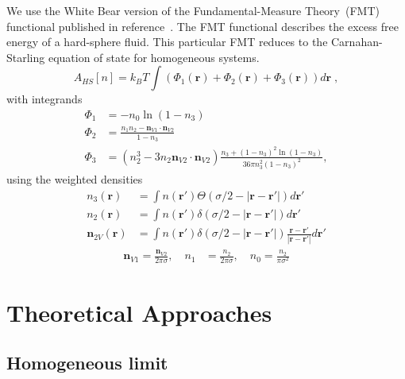 \documentclass[letterpaper,twocolumn,amsmath,amssymb,jcp,10pt,aip]{revtex4-1}
\newcommand{\rr}{\textbf{r}}
\begin{document}
We use the White Bear version of the Fundamental-Measure Theory~(FMT)
functional published in reference~\cite{roth2002whitebear}.  The FMT
functional describes the excess free energy of a hard-sphere fluid.
This particular FMT reduces to the Carnahan-Starling equation of state
for homogeneous systems.
\begin{equation}
A_\textit{HS}[n] = k_B T \int \left(\Phi_1(\rr) + \Phi_2(\rr) + \Phi_3(\rr)\right) d\rr \; ,
\end{equation}
with integrands
\begin{align}
\Phi_1 &= -n_0 \ln\left( 1 - n_3\right)\\
\Phi_2 &= \frac{n_1 n_2 - \mathbf{n}_{V1} \cdot\mathbf{n}_{V2}}{1-n_3} \\
\Phi_3 &= (n_2^3 - 3 n_2 \mathbf{n}_{V2} \cdot \mathbf{n}_{V2}) \frac{
  n_3 + (1-n_3)^2 \ln(1-n_3)
}{
  36\pi n_3^2\left( 1 - n_3 \right)^2
} ,
\end{align}
using the weighted densities
\begin{align}
  n_3(\rr) &= \int n(\rr') \Theta(\sigma/2 -\left|\rr - \rr'\right|)
  d\rr' \label{eq:FMn3} \\
  n_2(\rr) &= \int n(\rr') \delta(\sigma/2 -\left|\rr - \rr'\right|) d\rr' \\
  \mathbf{n}_{2V}(\rr) &= \int n(\rr') \delta(\sigma/2 -\left|\rr - \rr'\right|) \frac{\rr-\rr'}{|\rr-\rr'|}d\rr'
\end{align}
\begin{align}
  \mathbf{n}_{V1} = \frac{\mathbf{n}_{V2}}{2\pi \sigma}, \quad
  n_1 &= \frac{n_2}{2\pi \sigma} , \quad
  n_0 = \frac{n_2}{\pi \sigma^2} \label{eq:FMrest}
\end{align}


\section{Theoretical Approaches}

\subsection{Homogeneous limit}
\end{document}
